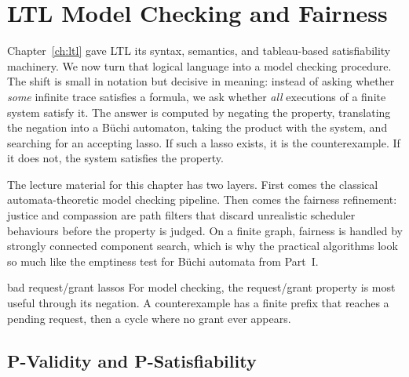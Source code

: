 
\chapter{LTL Model Checking and Fairness}
\label{ch:ltl-mc-fairness}


Chapter~\ref{ch:ltl} gave LTL its syntax, semantics, and tableau-based
satisfiability machinery.  We now turn that logical language into a model
checking procedure.  The shift is small in notation but decisive in
meaning: instead of asking whether \emph{some} infinite trace satisfies a
formula, we ask whether \emph{all} executions of a finite system satisfy it.
The answer is computed by negating the property, translating the negation
into a B\"uchi automaton, taking the product with the system, and searching
for an accepting lasso.  If such a lasso exists, it is the counterexample.
If it does not, the system satisfies the property.

The lecture material for this chapter has two layers.  First comes the
classical automata-theoretic model checking pipeline.  Then comes the
fairness refinement: justice and compassion are path filters that discard
unrealistic scheduler behaviours before the property is judged.  On a finite
graph, fairness is handled by strongly connected component search, which is
why the practical algorithms look so much like the emptiness test for
B\"uchi automata from Part~I.


\begin{runningexample}{bad request/grant lassos}
For model checking, the request/grant property is most useful through its
negation.  A counterexample has a finite prefix that reaches a pending request,
then a cycle where no grant ever appears.
\end{runningexample}

\section{P-Validity and P-Satisfiability}
\label{sec:ltl-mc-pipeline}

